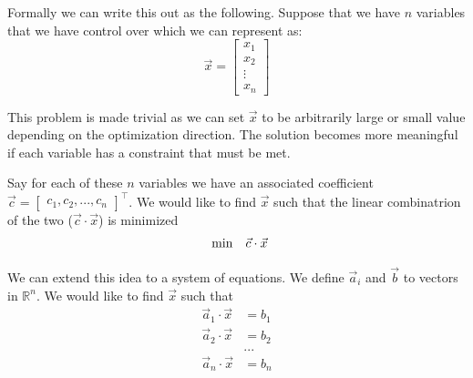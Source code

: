 \documentclass{article}
\begin{document}
Formally we can write this out as the following. Suppose that we have \( n \) variables that we have control over which we can represent as:
\[
\vec{x} = \begin{bmatrix} x_1 \\ x_2 \\ \vdots \\ x_n \end{bmatrix}
\]

This problem is made trivial as we can set \( \vec{x} \) to be arbitrarily large or small value depending on the optimization direction.
The solution becomes more meaningful if each variable has a constraint that must be met.

Say for each of these \( n \) variables we have an associated coefficient \( \vec{c} = \begin{bmatrix} c_1, c_2, ..., c_n  \end{bmatrix}^\top \).
We would like to find \( \vec{x} \) such that the linear combinatrion of the two (\( \vec{c} \cdot \vec{x} \)) is minimized
\begin{align*}
  \begin{array}{ll@{}ll}
  \min  & \vec{c} \cdot \vec{x}
  \end{array}
\end{align*}

We can extend this idea to a system of equations. We define \( \vec{a}_i \) and \( \vec{b} \) to vectors in $\mathbb{R}^n$. We would like to find \( \vec{x} \) such that
\begin{align*}
\vec{a}_1 \cdot \vec{x} &= b_1 \\
\vec{a}_2 \cdot \vec{x} &= b_2 \\
& ...  \\
\vec{a}_n \cdot \vec{x} &= b_n \\
\end{align*}
\end{document}
